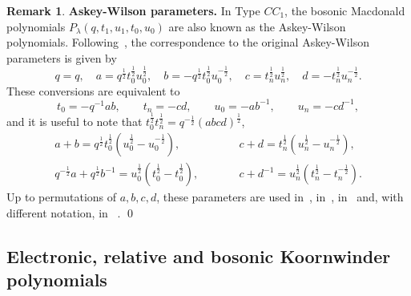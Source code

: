 \documentclass[11pt]{article}
\theoremstyle{plain}
\theoremstyle{definition}
\newtheorem{remark}[thm]{Remark}
\theoremstyle{remark}
\numberwithin{equation}{section}
\newcounter{r}
\newcounter{s}
\begin{document}
\begin{remark} \textbf{Askey-Wilson parameters.}
In Type $CC_1$, the bosonic Macdonald polynomials $P_\lambda(q, t_1,u_1,t_0,u_0)$
are also known as the Askey-Wilson polynomials. Following~\cite[\S3]{Nou95}, the correspondence to the original Askey-Wilson parameters is given by
\begin{equation}
q=q, \quad
a = q^{\frac12}t_0^{\frac12}u_0^{\frac12}, \quad
b = - q^{\frac12}t_0^{\frac12}u_0^{-\frac12}, \quad
c = t_n^{\frac12}u_n^{\frac12}, \quad
d = -t_n^{\frac12}u_n^{-\frac12}.
\label{AWparams}
\end{equation} 
These conversions are equivalent to
$$t_0 = -q^{-1}ab, \qquad t_n = -cd, \qquad u_0 = -ab^{-1}, \qquad u_n = -cd^{-1},$$
and it is useful to note that $t_0^{\frac12}t_n^{\frac12} = q^{-\frac12}(abcd)^{\frac12}$, 
$$
\begin{array}{lcl}
a+b = q^{\frac12}t_0^{\frac12}(u_0^{\frac12}-u_0^{-\frac12}),
& \qquad & 
c+d = t_n^{\frac12}(u_n^{\frac12}-u_n^{-\frac12}), \\
q^{-\frac12}a+q^{\frac12}b^{-1} = u_0^{\frac12}(t_0^{\frac12}-t_0^{\frac12}), 
& & 
c+d^{-1} = u_n^{\frac12}(t_n^{\frac12}-t_n^{-\frac12}).
\end{array}
$$
Up to permutations of $a,b,c,d$, these parameters are used 
in~\cite[(1)]{Sah00}, 
in~\cite[(17)]{CGdGW16}, 
in~\cite[Def. 2.2]{CMW23} 
and, with different notation, in ~\cite[(5.1.14)]{Mac03}.  
\qed
\end{remark}


\subsection{Electronic, relative and bosonic Koornwinder polynomials}
\end{document}
